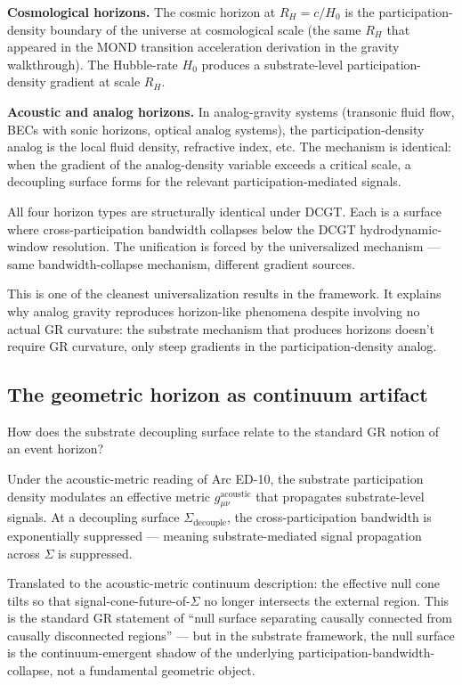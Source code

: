 \documentclass[11pt,a4paper]{article}
\begin{document}
\textbf{Cosmological horizons.} The cosmic horizon at $R_H = c/H_0$ is the participation-density boundary of the universe at cosmological scale (the same $R_H$ that appeared in the MOND transition acceleration derivation in the gravity walkthrough). The Hubble-rate $H_0$ produces a substrate-level participation-density gradient at scale $R_H$.

\textbf{Acoustic and analog horizons.} In analog-gravity systems (transonic fluid flow, BECs with sonic horizons, optical analog systems), the participation-density analog is the local fluid density, refractive index, etc. The mechanism is identical: when the gradient of the analog-density variable exceeds a critical scale, a decoupling surface forms for the relevant participation-mediated signals.

All four horizon types are structurally identical under DCGT. Each is a surface where cross-participation bandwidth collapses below the DCGT hydrodynamic-window resolution. The unification is forced by the universalized mechanism --- same bandwidth-collapse mechanism, different gradient sources.

This is one of the cleanest universalization results in the framework. It explains why analog gravity reproduces horizon-like phenomena despite involving no actual GR curvature: the substrate mechanism that produces horizons doesn't require GR curvature, only steep gradients in the participation-density analog.

\subsection{The geometric horizon as continuum artifact}

How does the substrate decoupling surface relate to the standard GR notion of an event horizon?

Under the acoustic-metric reading of Arc ED-10, the substrate participation density modulates an effective metric $g_{\mu\nu}^{\mathrm{acoustic}}$ that propagates substrate-level signals. At a decoupling surface $\Sigma_{\mathrm{decouple}}$, the cross-participation bandwidth is exponentially suppressed --- meaning substrate-mediated signal propagation across $\Sigma$ is suppressed.

Translated to the acoustic-metric continuum description: the effective null cone tilts so that signal-cone-future-of-$\Sigma$ no longer intersects the external region. This is the standard GR statement of ``null surface separating causally connected from causally disconnected regions'' --- but in the substrate framework, the null surface is the continuum-emergent shadow of the underlying participation-bandwidth-collapse, not a fundamental geometric object.
\end{document}
